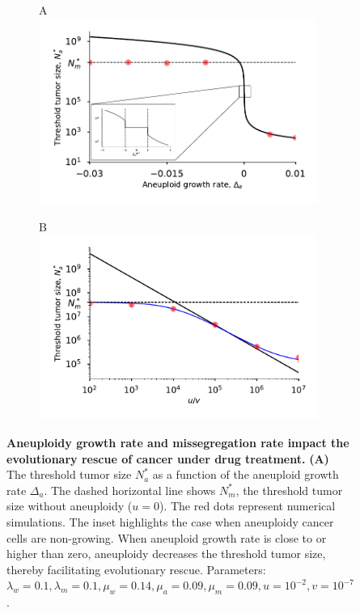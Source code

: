 \documentclass[12pt]{extarticle}
\begin{document}
\begin{figure}
\begin{subfigure}{0.5\textwidth}
A\\
\includegraphics[width=1\textwidth]{Figures/ThresholdPopulationSizePlot.pdf}
\end{subfigure}
\begin{subfigure}{0.5\textwidth}
B\\
\includegraphics[width=1\textwidth]{Figures/ThresholdPopulationSizeVersusRatioPlot.pdf}
\end{subfigure}
\caption{
\textbf{Aneuploidy growth rate and missegregation rate impact the evolutionary rescue of cancer under drug treatment.}
\textbf{(A)} The threshold tumor size $N_a^*$ as a function of the aneuploid growth rate $\Delta_a$. The dashed horizontal line shows $N^*_m$, the threshold tumor size without aneuploidy ($u=0$). The red dots represent numerical simulations.  The inset highlights the case when aneuploidy cancer cells are non-growing. When aneuploid growth rate is close to or higher than zero, aneuploidy decreases the threshold tumor size, thereby facilitating evolutionary rescue. Parameters: $\lambda_w=0.1,\lambda_m=0.1,\mu_w=0.14,\mu_a=0.09,\mu_m=0.09, u=10^{-2}, v=10^{-7}$.
}
\end{figure}
\end{document}
